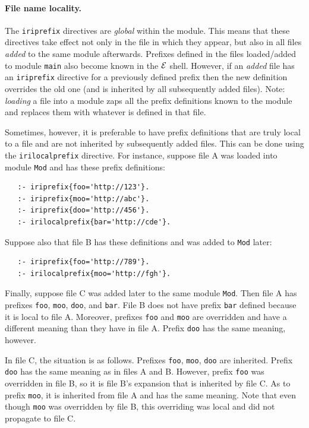 \documentclass[11pt]{article}
\newcommand{\ERGO}{\mbox{\ensuremath{\cal{E}}\smaller{{\sc{RGO}}}}\xspace}
\newcommand{\FLSYSTEM}{\ERGO}
\begin{document}
\paragraph{File name locality.}
The \texttt{iriprefix}  directives are \emph{global} within the module. 
This means that these directives take effect not only in the file in which they appear,
but also in all files \emph{added} to the same module afterwards.
Prefixes defined in  the files loaded/added to module \texttt{main}  also
become known in the \FLSYSTEM shell. However, if an \emph{added} file has an
\texttt{iriprefix} directive for a previously defined prefix then the new
definition overrides the old one (and is inherited by all subsequently
added files). Note: \emph{loading}  a file into a module
zaps all the prefix definitions known  
to the module and replaces them with whatever is defined in that file.

Sometimes, however, it is preferable to have prefix definitions that are
truly local to a file and are not inherited by subsequently added files.
This can be done using the \texttt{irilocalprefix} directive. For instance,
suppose file A was loaded into module \texttt{Mod} and
has these prefix definitions:
\begin{verbatim}
   :- iriprefix{foo='http://123'}.
   :- iriprefix{moo='http://abc'}.
   :- iriprefix{doo='http://456'}.
   :- irilocalprefix{bar='http://cde'}.
\end{verbatim}
Suppose also that file B has these definitions and was added to
\texttt{Mod} later: 
\begin{verbatim}
   :- iriprefix{foo='http://789'}.
   :- irilocalprefix{moo='http://fgh'}.
\end{verbatim}
Finally, suppose file C was added later to the same module \texttt{Mod}.
Then file A has prefixes \texttt{foo}, \texttt{moo}, \texttt{doo}, and
\texttt{bar}. File B does not have prefix \texttt{bar} defined because it
is local to file A. Moreover, prefixes \texttt{foo} and \texttt{moo} are
overridden and have a different meaning than they have in file A. Prefix
\texttt{doo} has the same meaning, however.

In file C, the situation is as follows. Prefixes \texttt{foo},
\texttt{moo}, \texttt{doo} are inherited. Prefix \texttt{doo} has the same
meaning as in files A and B. However, prefix \texttt{foo} was overridden
in file B, so it is file B's expansion that is inherited by file C.
As to prefix \texttt{moo}, it is inherited from file A and has the same
meaning. Note that even though \texttt{moo} was overridden by file B, this
overriding was local and did not propagate to file C.  
\end{document}
